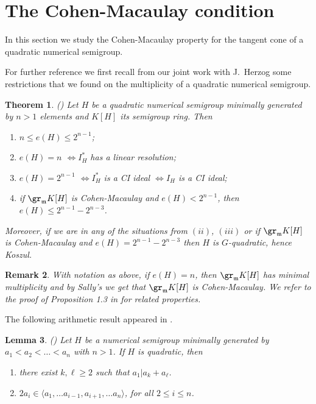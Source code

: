 \documentclass[12pt]{amsart}
\def\frk{\mathfrak}               %
\def\mm{{\frk m}}
\def\iff{\ifmmode\Longleftrightarrow \else
         \unskip${}\Longleftrightarrow{}$\ignorespaces\fi}
\newtheorem{Theorem}{Theorem}[section]
\newtheorem{Lemma}[Theorem]{Lemma}
\newtheorem{Remark}[Theorem]{Remark}
\begin{document}
\section{The Cohen-Macaulay condition}

In this section we study the Cohen-Macaulay property for the tangent cone of a quadratic numerical semigroup.

For further reference we first recall from our joint work with J.~Herzog \cite{HeS-quad}   some restrictions that we found on the multiplicity  of a quadratic numerical semigroup. 

\begin{Theorem}
\label{thm:bounds}
(\cite[1.1, 1.9, 1.12]{HeS-quad})
Let $H$ be a quadratic numerical semigroup minimally generated by $n>1$ elements and $K[H]$ its semigroup ring. Then
\begin{enumerate}
\item [(i)] $n \leq e(H) \leq 2^{n-1}$;
\item [(ii)] $e(H)=n$ \iff $I_H^*$ has a linear resolution;
\item [(iii)] $e(H)=2^{n-1}$ \iff $I_H^*$ is a CI ideal \iff $I_H$ is a CI ideal;
\item [(iv)] if $\gr_\mm K[H]$ is Cohen-Macaulay and $e(H) <2^{n-1}$, then $e(H) \leq 2^{n-1}-2^{n-3}$.
\end{enumerate}
Moreover, if we are in any of the situations from $(ii)$, $(iii)$ or  if $\gr_\mm K[H]$ is Cohen-Macaulay and  $e(H) = 2^{n-1}-2^{n-3}$ then $H$ is $G$-quadratic, hence Koszul.
\end{Theorem}

\begin{Remark}{\em
\label{rem:minimal}
With notation as above, if $e(H)=n$, then   $\gr_\mm K[H]$ has minimal multiplicity and by Sally's \cite[Theorem 2]{Sally-cm} we get that $\gr_\mm K[H]$ is Cohen-Macaulay.
We refer to the proof of Proposition 1.3 in \cite{HeS-quad} for related properties.
}
\end{Remark}

The following  arithmetic result appeared in \cite{HeS-quad}.

\begin{Lemma}(\cite[Lemma 1.6]{HeS-quad}) 
\label{lemma:quad-semi}
Let $H$ be a numerical semigroup minimally generated by $a_1<a_2<\dots <a_n$ with  $n>1$.
If $H$ is quadratic, then 
\begin{enumerate}
\item[(i)] there exist $ k, \ell \geq 2$ such that $a_1| a_k +a_\ell$.
\item [(ii)] $2 a_i \in \langle a_1, \dots a_{i-1}, a_{i+1}, \dots a_n\rangle$, for all $2\leq i \leq n$.
\end{enumerate}
\end{Lemma}
 
\end{document}
